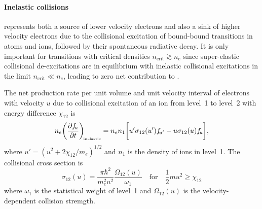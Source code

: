 \documentclass{emulateapj}
\begin{document}
\paragraph{Inelastic collisions}  represents both a
source of lower velocity electrons and also a sink of higher velocity
electrons due to the collisional excitation of bound-bound transitions
in atoms and ions, followed by their spontaneous radiative decay.  It
is only important for transitions with critical densities
\(n_{\mathrm{crit}} \gtrsim n_e\)
since super-elastic collisional de-excitations are in equilibrium with
inelastic collisional excitations in the limit
\(n_{\mathrm{crit}} \ll n_e\),
leading to zero net contribution to .  

The net production rate per unit volume and unit velocity interval of
electrons with velocity \(u\)
due to collisional excitation of an ion from level~1 to level~2 with
energy difference \(\chi_{12}\) is
\begin{equation}
  \label{eq:13}
  n_e \biggl( \frac{\partial f_{\!u}}{\partial t} \biggr)_{\!\scriptscriptstyle\mathrm{inelastic}} = n_e n_1 
  \biggl[u' \sigma_{12}(u') f_{\!u'} - u \sigma_{12}(u) f_{\!u}\biggr], 
\end{equation}
where \(u' = (u^2 + 2 \chi_{12}/m_e)^{1/2}\) and \(n_1\) is
the density of ions in level~1. The collisional cross section is
\begin{equation}
  \label{eq:16}
  \sigma_{12}(u) =
  \frac{\pi \hbar^2}{m_e^2 u^2} \frac{\Omega_{12}(u)}{\omega_1}
  \quad\mathrm{for}\quad
  \textstyle\frac12 m u^2 \ge \chi_{12} 
\end{equation}
where \(\omega_1\) is the statistical weight of level~1 and
\(\Omega_{12}(u)\) is the velocity-dependent collision stremgth.  
\end{document}
